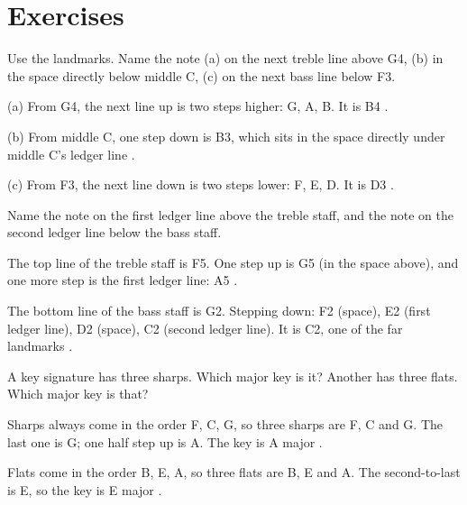 \section*{Exercises}

\begin{exercise}
Use the landmarks. Name the note (a) on the next treble line above G4, (b) in the space directly below middle C, (c) on the next bass line below F3.
\end{exercise}

\begin{answerbox}
(a) From G4, the next line up is two steps higher: G, A, B. It is B4 .

(b) From middle C, one step down is B3, which sits in the space directly under middle C's ledger line .

(c) From F3, the next line down is two steps lower: F, E, D. It is D3 .
\end{answerbox}

\begin{exercise}
Name the note on the first ledger line above the treble staff, and the note on the second ledger line below the bass staff.
\end{exercise}

\begin{answerbox}
The top line of the treble staff is F5. One step up is G5 (in the space above), and one more step is the first ledger line: A5 .

The bottom line of the bass staff is G2. Stepping down: F2 (space), E2 (first ledger line), D2 (space), C2 (second ledger line). It is C2, one of the far landmarks .
\end{answerbox}

\begin{exercise}
A key signature has three sharps. Which major key is it? Another has three flats. Which major key is that?
\end{exercise}

\begin{answerbox}
Sharps always come in the order F, C, G, so three sharps are F\sh, C\sh{} and G\sh. The last one is G\sh; one half step up is A. The key is A major .

Flats come in the order B, E, A, so three flats are B\fl, E\fl{} and A\fl. The second-to-last is E\fl, so the key is E\fl{} major .
\end{answerbox}

